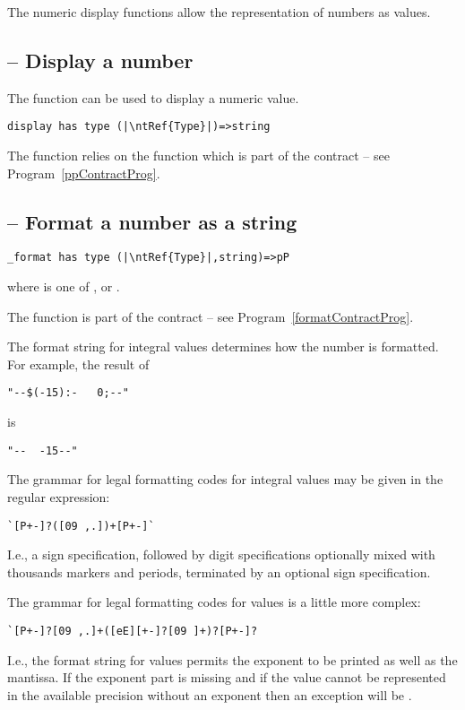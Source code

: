 The numeric display functions allow the representation of numbers as  values.

\subsection{ -- Display a number}
\label{displayNumFun}

The  function can be used to display a numeric value.
\begin{lstlisting}[escapechar=|]
display has type (|\ntRef{Type}|)=>string
\end{lstlisting}
The  function relies on the  function which is part of the  contract -- see Program~\vref{ppContractProg}.

\subsection{ -- Format a number as a string}
\label{formatNumber}
\begin{lstlisting}[escapechar=|]
_format has type (|\ntRef{Type}|,string)=>pP
\end{lstlisting}
where  is one of ,  or .

The  function is part of the  contract -- see Program~\vref{formatContractProg}.

The format string for integral values determines how the number is formatted. For example, the result of
\begin{lstlisting}
"--$(-15):-   0;--"
\end{lstlisting}
is
\begin{lstlisting}
"--  -15--"
\end{lstlisting}

The grammar for legal formatting codes for integral values may be given in the regular expression:
\begin{lstlisting}
`[P+-]?([09 ,.])+[P+-]`
\end{lstlisting}
I.e., a sign specification, followed by digit specifications optionally mixed with thousands markers and periods, terminated by an optional sign specification.

The grammar for legal formatting codes for  values is a little more complex:
\begin{lstlisting}
`[P+-]?[09 ,.]+([eE][+-]?[09 ]+)?[P+-]?
\end{lstlisting}
I.e., the format string for  values permits the exponent to be printed as well as the mantissa. If the exponent part is missing and if the  value cannot be represented in the available precision without an exponent then an exception will be .

